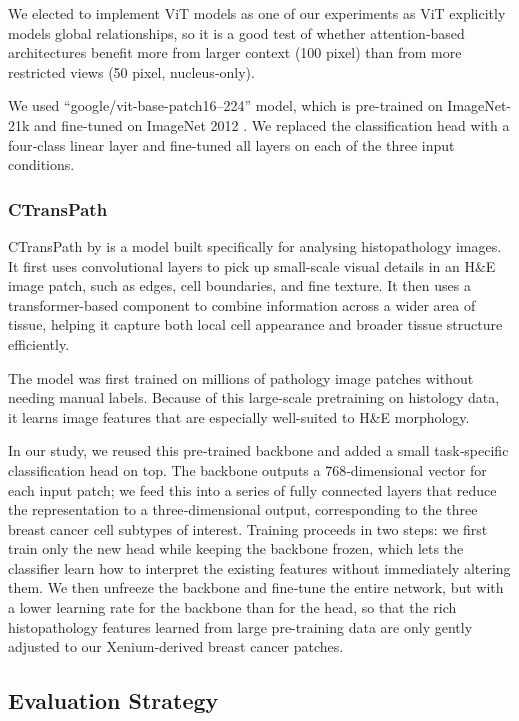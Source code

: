\documentclass[11pt,a4paper]{article}
\begin{document}
    We elected to implement ViT models as one of our experiments as ViT explicitly models global relationships, so it is a good test of whether attention‑based architectures benefit more from larger context (100 pixel) than from more restricted views (50 pixel, nucleus‑only).
    
    We used “google/vit-base-patch16–224” model, which is pre-trained on ImageNet-21k and fine-tuned on ImageNet 2012 \citep{huggingface2021,dosovitskiy2021}. We replaced the classification head with a four‑class linear layer and fine-tuned all layers on each of the three input conditions.\


\subsubsection{CTransPath} 

    CTransPath by \cite{WANG2022102559} is a model built specifically for analysing histopathology images. It first uses convolutional layers to pick up small-scale visual details in an H\&E image patch, such as edges, cell boundaries, and fine texture. It then uses a transformer-based component to combine information across a wider area of tissue, helping it capture both local cell appearance and broader tissue structure efficiently.

    The model was first trained on millions of pathology image patches without needing manual labels. Because of this large-scale pretraining on histology data, it learns image features that are especially well-suited to H\&E morphology.

    In our study, we reused this pre‑trained backbone and added a small task‑specific classification head on top. The backbone outputs a 768‑dimensional vector for each input patch; we feed this into a series of fully connected layers that reduce the representation to a three‑dimensional output, corresponding to the three breast cancer cell subtypes of interest. Training proceeds in two steps: we first train only the new head while keeping the backbone frozen, which lets the classifier learn how to interpret the existing features without immediately altering them. We then unfreeze the backbone and fine‑tune the entire network, but with a lower learning rate for the backbone than for the head, so that the rich histopathology features learned from large pre-training data are only gently adjusted to our Xenium‑derived breast cancer patches.

\subsection{Evaluation Strategy}
\end{document}
